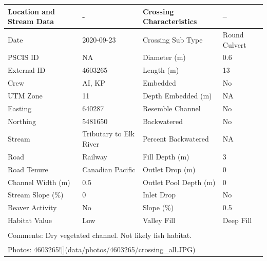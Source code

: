 \documentclass[
]{book}
\begin{document}
\begin{tabular}{l|l|l|l}
\hline
Location and Stream Data & - & Crossing Characteristics & --\\
\hline
Date & 2020-09-23 & Crossing Sub Type & Round Culvert\\
\hline
PSCIS ID & NA & Diameter (m) & 0.6\\
\hline
External ID & 4603265 & Length (m) & 13\\
\hline
Crew & AI, KP & Embedded & No\\
\hline
UTM Zone & 11 & Depth Embedded (m) & NA\\
\hline
Easting & 640287 & Resemble Channel & No\\
\hline
Northing & 5481650 & Backwatered & No\\
\hline
Stream & Tributary to Elk River & Percent Backwatered & NA\\
\hline
Road & Railway & Fill Depth (m) & 3\\
\hline
Road Tenure & Canadian Pacific & Outlet Drop (m) & 0\\
\hline
Channel Width (m) & 0.5 & Outlet Pool Depth (m) & 0\\
\hline
Stream Slope (\%) & 0 & Inlet Drop & No\\
\hline
Beaver Activity & No & Slope (\%) & 0.5\\
\hline
Habitat Value & Low & Valley Fill & Deep Fill\\
\hline
\multicolumn{4}{l}{\textsuperscript{} Comments: Dry vegetated channel. Not likely fish habitat.}\\
\multicolumn{4}{l}{\textsuperscript{} Photos: 4603265![](data/photos/4603265/crossing\_all.JPG)}\\
\end{tabular}
\end{document}
